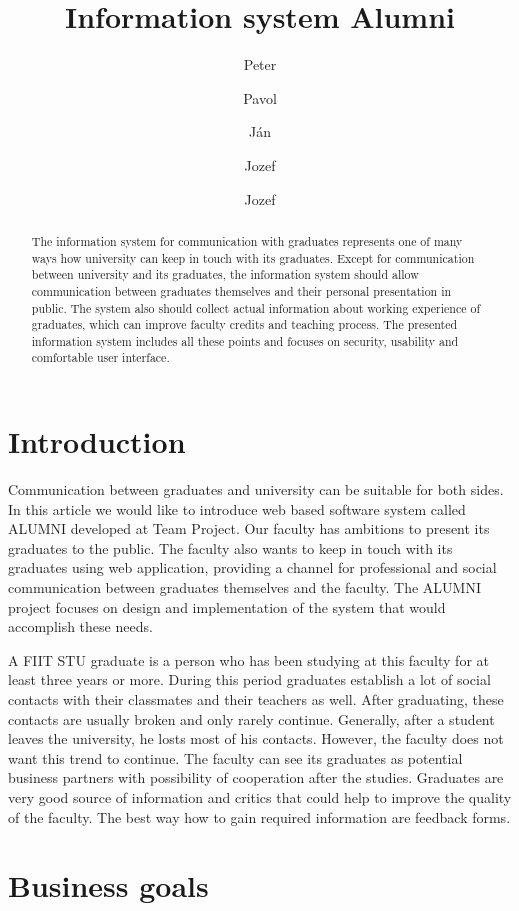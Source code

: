\documentclass{iitsrc}[2006/14/02]
\title{Information system Alumni}
\author{Peter}{C\'ich}
\author{Pavol}{F\'abik}
\author{J\'an}{Garaj}
\author{Jozef}{Hergott}
\author{Jozef}{Hopko}
\begin{document}
\begin{abstract}
The information system for communication with graduates represents one of many ways how university can keep in touch with its graduates. Except for communication between university and its graduates, the information system should allow communication between graduates themselves and their personal presentation in public. The system also should collect actual information about working experience of graduates, which can improve faculty credits and teaching process. The presented information system includes all these points and focuses on security, usability and comfortable user interface.
\end{abstract}


\section{Introduction}

Communication between graduates and university can be suitable for both sides. In this article we would like to introduce web based software system called ALUMNI developed at Team Project. Our faculty has ambitions to present its graduates to the public. The faculty also wants to keep in touch with its graduates using web application, providing a channel for professional and social communication between graduates themselves and the faculty. The ALUMNI project focuses on design and implementation of the system that would accomplish these needs. 

A FIIT STU graduate is a person who has been studying at this faculty for at least three years or more. During this period graduates establish a lot of social contacts with their classmates and their teachers as well. After graduating, these contacts are usually broken and only rarely continue. Generally, after a student leaves the university, he losts most of his contacts. However, the faculty does not want this trend to continue. The faculty can see its graduates as potential business partners with possibility of cooperation after the studies. Graduates are very good source of information and critics that could help to improve the quality of the faculty. The best way how to gain required information are feedback forms.


\section{Business goals}
\end{document}
